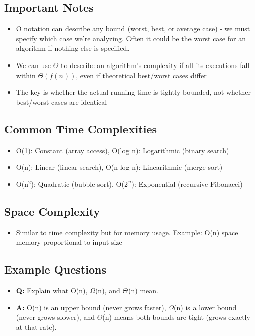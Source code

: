\documentclass[11pt,a4paper]{article}
\begin{document}
\begin{multicols}{2}
\subsection{Important Notes}
\begin{itemize}
    \item O notation can describe any bound (worst, best, or average case) - we must specify which case we're analyzing. Often it could be the worst case for an algorithm if nothing else is specified.
    \item We can use $\Theta$ to describe an algorithm's complexity if all its executions fall within $\Theta(f(n))$, even if theoretical best/worst cases differ
    \item The key is whether the actual running time is tightly bounded, not whether best/worst cases are identical
\end{itemize}

\subsection{Common Time Complexities}
\begin{itemize}
    \item O(1): Constant (array access), O(log n): Logarithmic (binary search)
    \item O(n): Linear (linear search), O(n log n): Linearithmic (merge sort)
    \item O(n$^2$): Quadratic (bubble sort), O($2^n$): Exponential (recursive Fibonacci)
\end{itemize}

\subsection{Space Complexity}
\begin{itemize}
    \item Similar to time complexity but for memory usage. Example: O(n) space = memory proportional to input size
\end{itemize}

\subsection{Example Questions}
\begin{itemize}
    \item \textbf{Q:} Explain what O(n), $\Omega$(n), and $\Theta$(n) mean.
    \item \textbf{A:} O(n) is an upper bound (never grows faster), $\Omega$(n) is a lower bound (never grows slower), and $\Theta$(n) means both bounds are tight (grows exactly at that rate).


\end{itemize}
\end{multicols}
\end{document}
